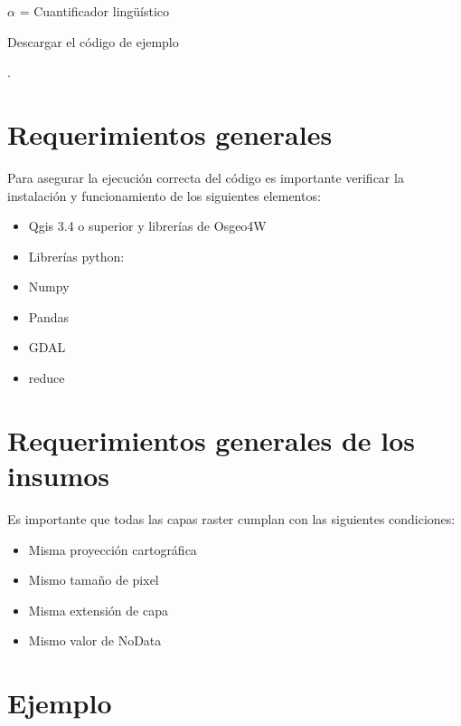 \documentclass[letterpaper,10pt,spanish]{sphinxmanual}
\begin{document}
\(\alpha\) = Cuantificador lingüístico

Descargar el código de ejemplo

.


\section{Requerimientos generales}
\label{\detokenize{owa:requerimientos-generales}}
Para asegurar la ejecución correcta del código es importante
verificar la instalación y funcionamiento de los siguientes elementos:
\begin{itemize}
\item {} 
Qgis 3.4 o superior y librerías de Osgeo4W

\item {} 
Librerías python:

\end{itemize}
\begin{itemize}
\item {} 
Numpy

\item {} 
Pandas

\item {} 
GDAL

\item {} 
reduce

\end{itemize}


\section{Requerimientos generales de los insumos}
\label{\detokenize{owa:requerimientos-generales-de-los-insumos}}
Es importante que todas las capas raster cumplan con las siguientes condiciones:
\begin{itemize}
\item {} 
Misma proyección cartográfica

\item {} 
Mismo tamaño de pixel

\item {} 
Misma extensión de capa

\item {} 
Mismo valor de NoData

\end{itemize}


\section{Ejemplo}
\label{\detokenize{owa:ejemplo}}
\end{document}
